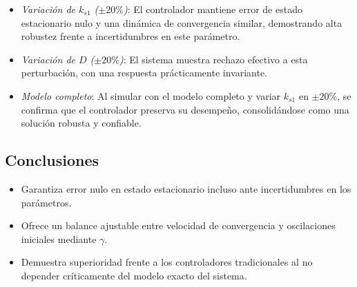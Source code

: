 \documentclass[letterpaper, 10 pt, conference]{ieeeconf}  %
\begin{document}
\begin{itemize}
    \item \textit{Variación de \(k_{s1}\) (\(\pm 20\%\))}: El controlador mantiene error de estado estacionario nulo y una dinámica de convergencia similar, demostrando alta robustez frente a incertidumbres en este parámetro.
    \item \textit{Variación de \(D\) (\(\pm 20\%\))}: El sistema muestra rechazo efectivo a esta perturbación, con una respuesta prácticamente invariante.
    \item \textit{Modelo completo}: Al simular con el modelo completo y variar \(k_{s1}\) en \(\pm 20\%\), se confirma que el controlador preserva su desempeño, consolidándose como una solución robusta y confiable.
\end{itemize}

\subsection{Conclusiones}
\begin{itemize}
    \item Garantiza error nulo en estado estacionario incluso ante incertidumbres en los parámetros.
    \item Ofrece un balance ajustable entre velocidad de convergencia y oscilaciones iniciales mediante \(\gamma\).
    \item Demuestra superioridad frente a los controladores tradicionales al no depender críticamente del modelo exacto del sistema.
\end{itemize}
\end{document}
